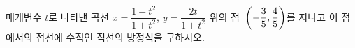 매개변수 $t$로 나타낸 곡선 $x=\dfrac{1-t^2}{1+t^2}$, $y=\dfrac{2t}{1+t^2}$ 위의 점~$\left(-\dfrac{3}{5}{,}\mkern3mu\mathopen{}\dfrac{4}{5}\right)$를 지나고 이 점에서의 접선에 수직인 직선의 방정식을 구하시오.
